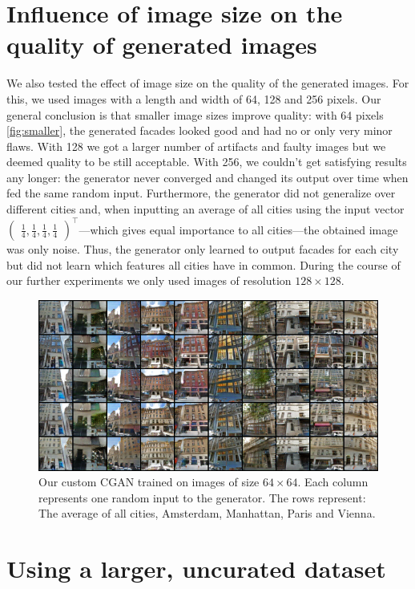 \documentclass[a4paper]{article}
\begin{document}
\section{Influence of image size on the quality of generated images}

We also tested the effect of image size on the quality of the generated images. For this, we used images with a length and width of 64, 128 and 256 pixels. Our general conclusion is that smaller image sizes improve quality: with 64 pixels \autoref{fig:smaller}, the generated facades looked good and had no or only very minor flaws. With 128 we got a larger number of artifacts and faulty images but we deemed quality to be still acceptable. With 256, we couldn't get satisfying results any longer: the generator never converged and changed its output over time when fed the same random input. Furthermore, the generator did not generalize over different cities and, when inputting an average of all cities using the input vector $\begin{pmatrix}\frac{1}{4}, \frac{1}{4}, \frac{1}{4}, \frac{1}{4}\end{pmatrix}^\top$---which gives equal importance to all cities---the obtained image was only noise. Thus, the generator only learned to output facades for each city but did not learn which features all cities have in common. During the course of our further experiments we only used images of resolution $128\times 128$.

\begin{figure}[h]
\centering
\includegraphics[width=0.75\linewidth]{figures/good_hack_64.png}
\caption{Our custom CGAN trained on images of size $64\times 64$. Each column represents one random input to the generator. The rows represent: The average of all cities, Amsterdam, Manhattan, Paris and Vienna.}
\label{fig:smaller}
\end{figure}

\section{Using a larger, uncurated dataset}
\end{document}
